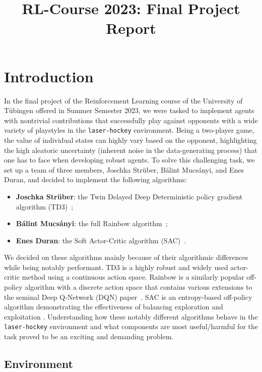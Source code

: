 \documentclass[11pt]{article}
\title{RL-Course 2023: Final Project Report}
\author{\theteam}
\begin{document}
\maketitle

\section{Introduction}

In the final project of the Reinforcement Learning course of the University of Tübingen offered in Summer Semester 2023, we were tasked to implement agents with nontrivial contributions that successfully play against opponents with a wide variety of playstyles in the \texttt{laser-hockey} environment. Being a two-player game, the value of individual states can highly vary based on the opponent, highlighting the high aleatoric uncertainty (inherent noise in the data-generating process) that one has to face when developing robust agents. To solve this challenging task, we set up a team of three members, Joschka Strüber, Bálint Mucsányi, and Enes Duran, and decided to implement the following algorithms:
\begin{itemize}
    \item \textbf{Joschka Strüber}: the Twin Delayed Deep Deterministic policy gradient algorithm (TD3)~\cite{fujimoto2018:TD3};
    \item \textbf{Bálint Mucsányi}: the full Rainbow algorithm~\cite{Hessel2018:Rainbow};
    \item \textbf{Enes Duran}: the Soft Actor-Critic algorithm (SAC)~\cite{HaarnojaAbbeelLevine2018:SAC}.
\end{itemize}

We decided on these algorithms mainly because of their algorithmic differences while being notably performant. TD3 is a highly robust and widely used actor-critic method using a continuous action space. Rainbow is a similarly popular off-policy algorithm with a discrete action space that contains various extensions to the seminal Deep Q-Network (DQN) paper~\cite{mnih2015humanlevel}. SAC is an entropy-based off-policy algorithm demonstrating the effectiveness of balancing exploration and exploitation \cite{HaarnojaAbbeelLevine2018:SAC}. Understanding how these notably different algorithms behave in the \texttt{laser-hockey} environment and what components are most useful/harmful for the task proved to be an exciting and demanding problem.

\subsection{Environment}\label{subsec:environment}
\end{document}
